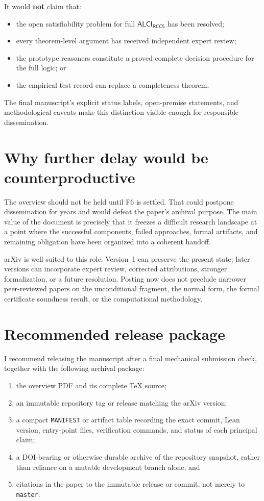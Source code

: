 \documentclass[11pt]{article}
\newcommand{\logic}{\ensuremath{\mathsf{ALCI}_{\mathsf{RCC5}}}\xspace}
\begin{document}
It would \textbf{not} claim that:

\begin{itemize}
  \item the open satisfiability problem for full \logic has been resolved;
  \item every theorem-level argument has received independent expert review;
  \item the prototype reasoners constitute a proved complete decision procedure for the full logic; or
  \item the empirical test record can replace a completeness theorem.
\end{itemize}

The final manuscript's explicit status labels, open-premise statements, and methodological caveats make this distinction visible enough for responsible dissemination.

\section{Why further delay would be counterproductive}

The overview should not be held until F6 is settled. That could postpone dissemination for years and would defeat the paper's archival purpose. The main value of the document is precisely that it freezes a difficult research landscape at a point where the successful components, failed approaches, formal artifacts, and remaining obligation have been organized into a coherent handoff.

arXiv is well suited to this role. Version~1 can preserve the present state; later versions can incorporate expert review, corrected attributions, stronger formalization, or a future resolution. Posting now does not preclude narrower peer-reviewed papers on the unconditional fragment, the normal form, the formal certificate soundness result, or the computational methodology.

\section{Recommended release package}

I recommend releasing the manuscript after a final mechanical submission check, together with the following archival package:

\begin{enumerate}
  \item the overview PDF and its complete TeX source;
  \item an immutable repository tag or release matching the arXiv version;
  \item a compact \texttt{MANIFEST} or artifact table recording the exact commit, Lean version, entry-point files, verification commands, and status of each principal claim;
  \item a DOI-bearing or otherwise durable archive of the repository snapshot, rather than reliance on a mutable development branch alone; and
  \item citations in the paper to the immutable release or commit, not merely to \texttt{master}.
\end{enumerate}
\end{document}
